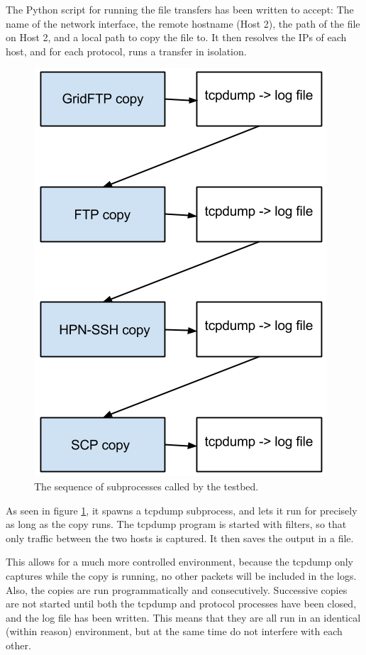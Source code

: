 \documentclass{sig-alternate-05-2015}
\begin{document}
The Python script for running the file transfers has been written to accept: The name of the network interface, the remote hostname (Host 2), the path of the file on Host 2, and a local path to copy the file to.
It then resolves the IPs of each host, and for each protocol, runs a transfer in isolation. 
\begin{figure}[H]
	\centering
	\includegraphics[height=0.5\textheight]{img/seq_example}
	\caption{The sequence of subprocesses called by the testbed.
	         \label{fig:testbed_sequence}}
\end{figure}
As seen in figure \ref{fig:testbed_sequence}, it spawns a tcpdump subprocess, and lets it run for precisely as long as the copy runs. The tcpdump program is started with filters, so that only traffic between the two hosts is captured. It then saves the output in a file.

This allows for a much more controlled environment, because the tcpdump only captures while the copy is running, no other packets will be included in the logs. Also, the copies are run programmatically and consecutively. Successive copies are not started until both the tcpdump and protocol processes have been closed, and the log file has been written. This means that they are all run in an identical (within reason) environment, but at the same time do not interfere with each other.
\end{document}
